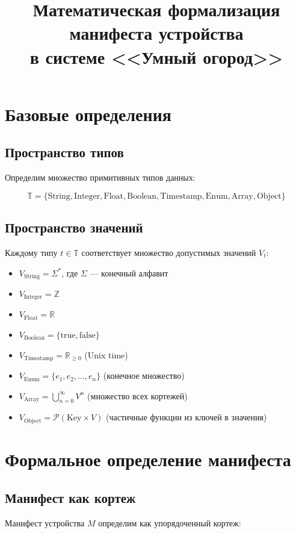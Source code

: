 \documentclass{article}
\title{Математическая формализация манифеста устройства \\
    в системе <<Умный огород>>}
\author{}
\date{}
\begin{document}
\maketitle


\section{Базовые определения}

\subsection{Пространство типов}
Определим множество примитивных типов данных:

\[
    \mathbb{T} = \{\text{String}, \text{Integer}, \text{Float}, \text{Boolean}, \text{Timestamp}, \text{Enum}, \text{Array}, \text{Object}\}
\]

\subsection{Пространство значений}
Каждому типу $t \in \mathbb{T}$ соответствует множество допустимых значений $V_t$:

\begin{itemize}
    \item $V_{\text{String}} = \Sigma^*$, где $\Sigma$ — конечный алфавит
    \item $V_{\text{Integer}} = \mathbb{Z}$
    \item $V_{\text{Float}} = \mathbb{R}$
    \item $V_{\text{Boolean}} = \{\text{true}, \text{false}\}$
    \item $V_{\text{Timestamp}} = \mathbb{R}_{\geq 0}$ (Unix time)
    \item $V_{\text{Enum}} = \{e_1, e_2, \ldots, e_n\}$ (конечное множество)
    \item $V_{\text{Array}} = \bigcup_{n=0}^{\infty} V^n$ (множество всех кортежей)
    \item $V_{\text{Object}} = \mathcal{P}(\text{Key} \times V)$ (частичные функции из ключей в значения)
\end{itemize}

\section{Формальное определение манифеста}

\subsection{Манифест как кортеж}
Манифест устройства $M$ определим как упорядоченный кортеж:
\end{document}
